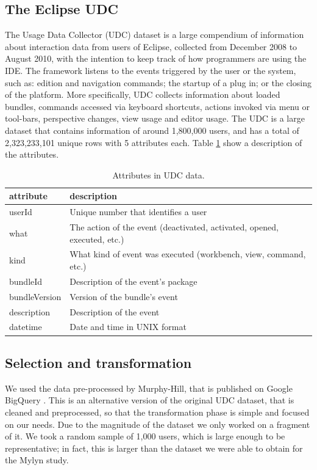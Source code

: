 \documentclass[times]{smrauth}
\begin{document}
\subsection{The Eclipse UDC}
The Usage Data Collector (UDC) dataset is a large compendium of information about interaction data from users of Eclipse, collected from December 2008 to August 2010, with the intention to keep track of how programmers are using the IDE. The framework listens to the events triggered by the user or the system, such as: edition and navigation commands; the startup of a plug in; or the closing of the platform. More specifically, UDC collects information about loaded bundles, commands accessed via keyboard shortcuts, actions invoked via menu or tool-bars, perspective changes, view usage and editor usage. The UDC is a large dataset that contains information of around 1,800,000 users, and has a total of 2,323,233,101 unique rows with 5 attributes each. Table \ref{tbl:att_udc} show a description of the attributes.


\begin{table}[ht!]
\tiny
\renewcommand{\arraystretch}{1.3}
\caption{Attributes in UDC data. }
\label{tbl:att_udc}
\centering
\begin{tabular}{|p{2.5cm}|p{7cm}|} 
  \hline 
attribute & description \\  
  \hline 
    \hline 
userId &  Unique number that identifies a user \\
what & The action of the event (deactivated, activated, opened, executed, etc.)  \\
kind & What kind of event was executed (workbench, view, command, etc.)  \\
bundleId & Description of the event's package  \\
bundleVersion & Version of the bundle's event  \\
description & Description of the event\\
datetime & Date and time in UNIX format\\
  \hline
\end{tabular}

\end{table}

\subsection{Selection and transformation}
We used the data pre-processed by Murphy-Hill, that is published on Google BigQuery \cite{SnipesETALASD}. This is an alternative version of the original UDC dataset, that is cleaned and preprocessed, so that the transformation phase is simple and focused on our needs. Due to the magnitude of the dataset we only worked on a fragment of it. We took a random sample of 1,000 users, which is large enough to be representative; in fact, this is larger than the dataset we were able to obtain for the Mylyn study.
\end{document}

